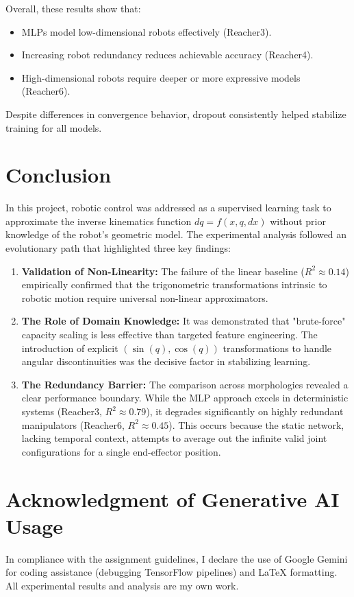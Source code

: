 \documentclass[a4paper,11pt]{article}
\begin{document}
Overall, these results show that:
\begin{itemize}
    \item MLPs model low-dimensional robots effectively (Reacher3).
    \item Increasing robot redundancy reduces achievable accuracy (Reacher4).
    \item High-dimensional robots require deeper or more expressive models 
          (Reacher6).
\end{itemize}

Despite differences in convergence behavior, dropout consistently helped stabilize 
training for all models.

\section{Conclusion}
In this project, robotic control was addressed as a supervised learning task to approximate the inverse kinematics function $dq = f(x, q, dx)$ without prior knowledge of the robot's geometric model.
The experimental analysis followed an evolutionary path that highlighted three key findings:

\begin{enumerate}
    \item \textbf{Validation of Non-Linearity:} The failure of the linear baseline ($R^2 \approx 0.14$) empirically confirmed that the trigonometric transformations intrinsic to robotic motion require universal non-linear approximators.
    
    \item \textbf{The Role of Domain Knowledge:} It was demonstrated that "brute-force" capacity scaling is less effective than targeted feature engineering. The introduction of explicit $(\sin(q), \cos(q))$ transformations to handle angular discontinuities was the decisive factor in stabilizing learning.
    
    \item \textbf{The Redundancy Barrier:} The comparison across morphologies revealed a clear performance boundary. While the MLP approach excels in deterministic systems (Reacher3, $R^2 \approx 0.79$), it degrades significantly on highly redundant manipulators (Reacher6, $R^2 \approx 0.45$). This occurs because the static network, lacking temporal context, attempts to average out the infinite valid joint configurations for a single end-effector position.
\end{enumerate}

\section*{Acknowledgment of Generative AI Usage}
In compliance with the assignment guidelines, I declare the use of Google Gemini for coding assistance (debugging TensorFlow pipelines) and LaTeX formatting. All experimental results and analysis are my own work.
\end{document}
